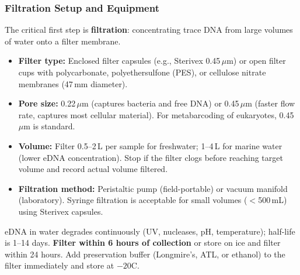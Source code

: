 \subsubsection{Filtration Setup and Equipment}

The critical first step is \textbf{filtration}: concentrating trace DNA from large volumes of water onto a filter membrane.

\begin{itemize}[nosep]
  \item \textbf{Filter type:} Enclosed filter capsules (e.g., Sterivex 0.45\,$\mu$m) or open filter cups with polycarbonate, polyethersulfone (PES), or cellulose nitrate membranes (47\,mm diameter).
  \item \textbf{Pore size:} 0.22\,$\mu$m (captures bacteria and free DNA) or 0.45\,$\mu$m (faster flow rate, captures most cellular material). For metabarcoding of eukaryotes, 0.45\,$\mu$m is standard.
  \item \textbf{Volume:} Filter 0.5--2\,L per sample for freshwater; 1--4\,L for marine water (lower eDNA concentration). Stop if the filter clogs before reaching target volume and record actual volume filtered.
  \item \textbf{Filtration method:} Peristaltic pump (field-portable) or vacuum manifold (laboratory). Syringe filtration is acceptable for small volumes ($<$500\,mL) using Sterivex capsules.
\end{itemize}

\begin{warningbox}[title={eDNA Degrades Rapidly}]
eDNA in water degrades continuously (UV, nucleases, pH, temperature); half-life is 1--14 days. \textbf{Filter within 6 hours of collection} or store on ice and filter within 24 hours. Add preservation buffer (Longmire's, ATL, or ethanol) to the filter immediately and store at $-20$\textdegree C.
\end{warningbox}

